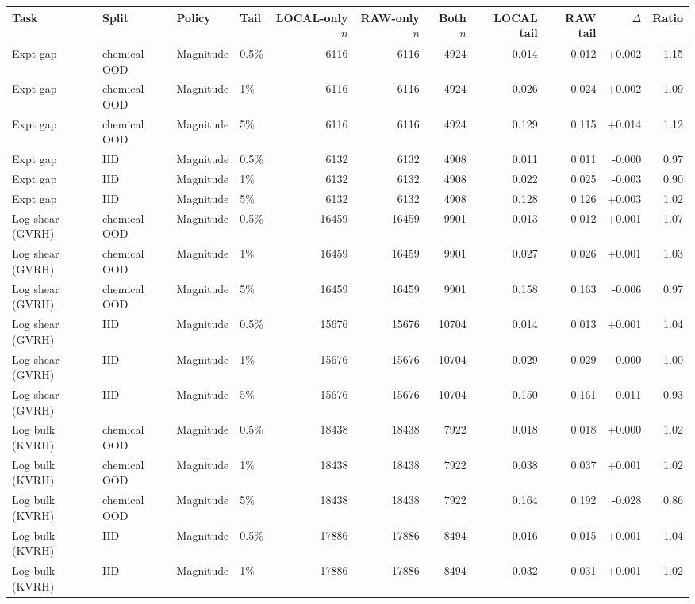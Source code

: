 \begin{tabular}{llllrrrrrrr}
\toprule
Task & Split & Policy & Tail & LOCAL-only $n$ & RAW-only $n$ & Both $n$ & LOCAL tail & RAW tail & $\Delta$ & Ratio \\
\midrule
Expt gap & chemical OOD & Magnitude & 0.5\% & 6116 & 6116 & 4924 & 0.014 & 0.012 & +0.002 & 1.15 \\
Expt gap & chemical OOD & Magnitude & 1\% & 6116 & 6116 & 4924 & 0.026 & 0.024 & +0.002 & 1.09 \\
Expt gap & chemical OOD & Magnitude & 5\% & 6116 & 6116 & 4924 & 0.129 & 0.115 & +0.014 & 1.12 \\
Expt gap & IID & Magnitude & 0.5\% & 6132 & 6132 & 4908 & 0.011 & 0.011 & -0.000 & 0.97 \\
Expt gap & IID & Magnitude & 1\% & 6132 & 6132 & 4908 & 0.022 & 0.025 & -0.003 & 0.90 \\
Expt gap & IID & Magnitude & 5\% & 6132 & 6132 & 4908 & 0.128 & 0.126 & +0.003 & 1.02 \\
Log shear (GVRH) & chemical OOD & Magnitude & 0.5\% & 16459 & 16459 & 9901 & 0.013 & 0.012 & +0.001 & 1.07 \\
Log shear (GVRH) & chemical OOD & Magnitude & 1\% & 16459 & 16459 & 9901 & 0.027 & 0.026 & +0.001 & 1.03 \\
Log shear (GVRH) & chemical OOD & Magnitude & 5\% & 16459 & 16459 & 9901 & 0.158 & 0.163 & -0.006 & 0.97 \\
Log shear (GVRH) & IID & Magnitude & 0.5\% & 15676 & 15676 & 10704 & 0.014 & 0.013 & +0.001 & 1.04 \\
Log shear (GVRH) & IID & Magnitude & 1\% & 15676 & 15676 & 10704 & 0.029 & 0.029 & -0.000 & 1.00 \\
Log shear (GVRH) & IID & Magnitude & 5\% & 15676 & 15676 & 10704 & 0.150 & 0.161 & -0.011 & 0.93 \\
Log bulk (KVRH) & chemical OOD & Magnitude & 0.5\% & 18438 & 18438 & 7922 & 0.018 & 0.018 & +0.000 & 1.02 \\
Log bulk (KVRH) & chemical OOD & Magnitude & 1\% & 18438 & 18438 & 7922 & 0.038 & 0.037 & +0.001 & 1.02 \\
Log bulk (KVRH) & chemical OOD & Magnitude & 5\% & 18438 & 18438 & 7922 & 0.164 & 0.192 & -0.028 & 0.86 \\
Log bulk (KVRH) & IID & Magnitude & 0.5\% & 17886 & 17886 & 8494 & 0.016 & 0.015 & +0.001 & 1.04 \\
Log bulk (KVRH) & IID & Magnitude & 1\% & 17886 & 17886 & 8494 & 0.032 & 0.031 & +0.001 & 1.02 \\

\end{tabular}
